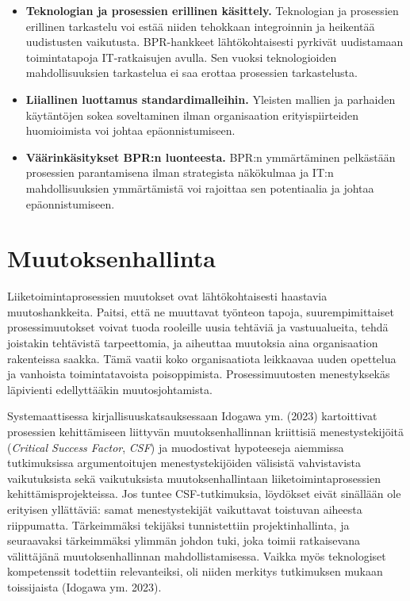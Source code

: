\documentclass[
  finnish,
  letterpaper,
  DIV=11,
  numbers=noendperiod,
  oneside]{scrreprt}
\begin{document}
\begin{itemize}
\item
  \textbf{Teknologian ja prosessien erillinen käsittely.} Teknologian ja
  prosessien erillinen tarkastelu voi estää niiden tehokkaan
  integroinnin ja heikentää uudistusten vaikutusta. BPR-hankkeet
  lähtökohtaisesti pyrkivät uudistamaan toimintatapoja IT-ratkaisujen
  avulla. Sen vuoksi teknologioiden mahdollisuuksien tarkastelua ei saa
  erottaa prosessien tarkastelusta.
\item
  \textbf{Liiallinen luottamus standardimalleihin.} Yleisten mallien ja
  parhaiden käytäntöjen sokea soveltaminen ilman organisaation
  erityispiirteiden huomioimista voi johtaa epäonnistumiseen.
\item
  \textbf{Väärinkäsitykset BPR:n luonteesta.} BPR:n ymmärtäminen
  pelkästään prosessien parantamisena ilman strategista näkökulmaa ja
  IT:n mahdollisuuksien ymmärtämistä voi rajoittaa sen potentiaalia ja
  johtaa epäonnistumiseen.
\end{itemize}

\section{Muutoksenhallinta}\label{muutoksenhallinta}

Liiketoimintaprosessien muutokset ovat lähtökohtaisesti haastavia
muutoshankkeita. Paitsi, että ne muuttavat työnteon tapoja,
suurempimittaiset prosessimuutokset voivat tuoda rooleille uusia
tehtäviä ja vastuualueita, tehdä joistakin tehtävistä tarpeettomia, ja
aiheuttaa muutoksia aina organisaation rakenteissa saakka. Tämä vaatii
koko organisaatiota leikkaavaa uuden opettelua ja vanhoista
toimintatavoista poisoppimista. Prosessimuutosten menestyksekäs
läpivienti edellyttääkin muutosjohtamista.

Systemaattisessa kirjallisuuskatsauksessaan Idogawa ym. (2023)
kartoittivat prosessien kehittämiseen liittyvän muutoksenhallinnan
kriittisiä menestystekijöitä (\emph{Critical Success Factor},
\emph{CSF}) ja muodostivat hypoteeseja aiemmissa tutkimuksissa
argumentoitujen menestystekijöiden välisistä vahvistavista vaikutuksista
sekä vaikutuksista muutoksenhallintaan liiketoimintaprosessien
kehittämisprojekteissa. Jos tuntee CSF-tutkimuksia, löydökset eivät
sinällään ole erityisen yllättäviä: samat menestystekijät vaikuttavat
toistuvan aiheesta riippumatta. Tärkeimmäksi tekijäksi tunnistettiin
projektinhallinta, ja seuraavaksi tärkeimmäksi ylimmän johdon tuki, joka
toimii ratkaisevana välittäjänä muutoksenhallinnan mahdollistamisessa.
Vaikka myös teknologiset kompetenssit todettiin relevanteiksi, oli
niiden merkitys tutkimuksen mukaan toissijaista (Idogawa ym. 2023).
\end{document}
